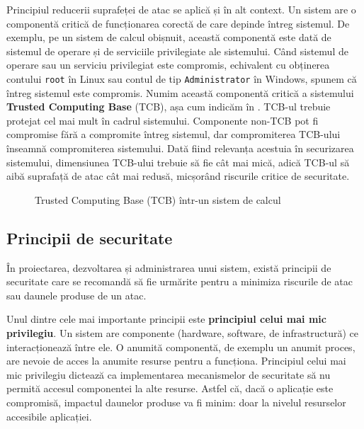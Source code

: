 Principiul reducerii suprafeței de atac se aplică și în alt context. Un sistem are o componentă critică de funcționarea corectă de care depinde întreg sistemul. De exemplu, pe un sistem de calcul obișnuit, această componentă este dată de sistemul de operare și de serviciile privilegiate ale sistemului. Când sistemul de operare sau un serviciu privilegiat este compromis, echivalent cu obținerea contului \texttt{root} în Linux sau contul de tip \texttt{Administrator} în Windows, spunem că întreg sistemul este compromis. Numim această componentă critică a sistemului \textbf{Trusted Computing Base} (TCB), așa cum indicăm în . TCB-ul trebuie protejat cel mai mult în cadrul sistemului. Componente non-TCB pot fi compromise fără a compromite întreg sistemul, dar compromiterea TCB-ului înseamnă compromiterea sistemului. Dată fiind relevanța acestuia în securizarea sistemului, dimensiunea TCB-ului trebuie să fie cât mai mică, adică TCB-ul să aibă suprafață de atac cât mai redusă, micșorând riscurile critice de securitate.

\begin{figure}[htbp]
  \centering
  \def\svgwidth{\columnwidth}
  
  \caption{Trusted Computing Base (TCB) într-un sistem de calcul}
  \label{fig:sec:tcb}
\end{figure}

\subsection{Principii de securitate}
\label{sec:sec:fundamentals:principles}

În proiectarea, dezvoltarea și administrarea unui sistem, există principii de securitate care se recomandă să fie urmărite pentru a minimiza riscurile de atac sau daunele produse de un atac.

Unul dintre cele mai importante principii este \textbf{principiul celui mai mic privilegiu}. Un sistem are componente (hardware, software, de infrastructură) ce interacționează între ele. O anumită componentă, de exemplu un anumit proces, are nevoie de acces la anumite resurse pentru a funcționa. Principiul celui mai mic privilegiu dictează ca implementarea mecanismelor de securitate să nu permită accesul componentei la alte resurse. Astfel că, dacă o aplicație este compromisă, impactul daunelor produse va fi minim: doar la nivelul resurselor accesibile aplicației.

